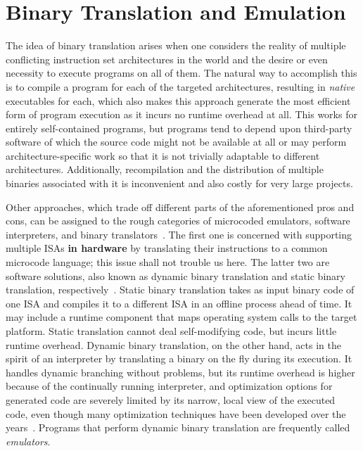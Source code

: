 \section{Binary Translation and Emulation}

The idea of binary translation arises when one considers the reality of multiple conflicting instruction set
architectures in the world and the desire or even necessity to execute programs on all of them. The natural way to
accomplish this is to compile a program for each of the targeted architectures, resulting in \textit{native} executables
for each, which also makes this approach generate the most efficient form of program execution as it incurs no runtime
overhead at all. This works for entirely self-contained programs, but programs tend to depend upon third-party software
of which the source code might not be available at all or may perform architecture-specific work so that it is not
trivially adaptable to different architectures. Additionally, recompilation and the distribution of multiple binaries
associated with it is inconvenient and also costly for very large projects.

Other approaches, which trade off different parts of the aforementioned pros and cons, can be assigned to the rough
categories of microcoded emulators, software interpreters, and binary translators~\cite{sites1993binary}. The first one
is concerned with supporting multiple \ac{ISA}s \textbf{in hardware} by translating their instructions to a common
microcode language; this issue shall not trouble us here. The latter two are software solutions, also known as dynamic
binary translation and static binary translation, respectively~\cite{cifuentes1996staticdynamic, Rocha2022Lasagne}.
Static binary translation takes as input binary code of one \ac{ISA} and compiles it to a different \ac{ISA} in an
offline process ahead of time. It may include a runtime component that maps operating system calls to the target
platform. Static translation cannot deal self-modifying code, but incurs little runtime overhead. Dynamic binary
translation, on the other hand, acts in the spirit of an interpreter by translating a binary on the fly during its
execution. It handles dynamic branching without problems, but its runtime overhead is higher because of the continually
running interpreter, and optimization options for generated code are severely limited by its narrow, local view of the
executed code, even though many optimization techniques have been developed over the
years~\cite{Guan+2010DbtOptimizations, Sun+2023DbtBranchPred, Hawkins2015OptimizingDbt, Kedia+2013DbtKernel}. Programs
that perform dynamic binary translation are frequently called \textit{emulators}.
